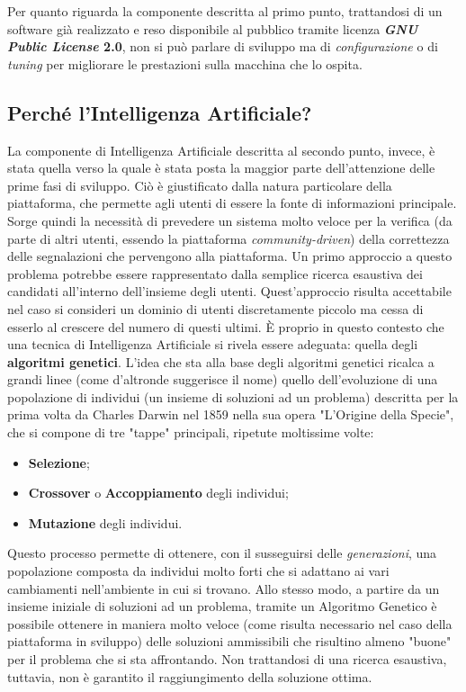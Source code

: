         Per quanto riguarda la componente descritta al primo punto, trattandosi di un software già realizzato e reso disponibile al pubblico tramite licenza \textbf{\textit{GNU Public License} 2.0}, non si può parlare di sviluppo ma di \textit{configurazione} o di \textit{tuning} per migliorare le prestazioni sulla macchina che lo ospita.

        \subsection{Perché l'Intelligenza Artificiale?}
            La componente di Intelligenza Artificiale descritta al secondo punto, invece, è stata quella verso la quale è stata posta la maggior parte dell'attenzione delle prime fasi di sviluppo. Ciò è giustificato dalla natura particolare della piattaforma, che permette agli utenti di essere la fonte di informazioni principale. Sorge quindi la necessità di prevedere un sistema molto veloce per la verifica (da parte di altri utenti, essendo la piattaforma \textit{community-driven}) della correttezza delle segnalazioni che pervengono alla piattaforma.  Un primo approccio a questo problema potrebbe essere rappresentato dalla semplice ricerca esaustiva dei candidati all'interno dell'insieme degli utenti. Quest'approccio risulta accettabile nel caso si consideri un dominio di utenti discretamente piccolo ma cessa di esserlo al crescere del numero di questi ultimi. È proprio in questo contesto che una tecnica di Intelligenza Artificiale si rivela essere adeguata: quella degli \textbf{algoritmi genetici}. L'idea che sta alla base degli algoritmi genetici ricalca a grandi linee (come d'altronde suggerisce il nome) quello dell'evoluzione di una popolazione di individui (un insieme di soluzioni ad un problema) descritta per la prima volta da Charles Darwin nel 1859 nella sua opera "L'Origine della Specie", che si compone di tre "tappe" principali, ripetute moltissime volte:

            \begin{itemize}
                \item \textbf{Selezione};
                \item \textbf{Crossover} o \textbf{Accoppiamento} degli individui;
                \item \textbf{Mutazione} degli individui.
            \end{itemize}

            Questo processo permette di ottenere, con il susseguirsi delle \textit{generazioni}, una popolazione composta da individui molto forti che si adattano ai vari cambiamenti nell'ambiente in cui si trovano.
            Allo stesso modo, a partire da un insieme iniziale di soluzioni ad un problema, tramite un Algoritmo Genetico è possibile ottenere in maniera molto veloce (come risulta necessario nel caso della piattaforma in sviluppo) delle soluzioni ammissibili che risultino almeno "buone" per il problema che si sta affrontando. Non trattandosi di una ricerca esaustiva, tuttavia, non è garantito il raggiungimento della soluzione ottima.

